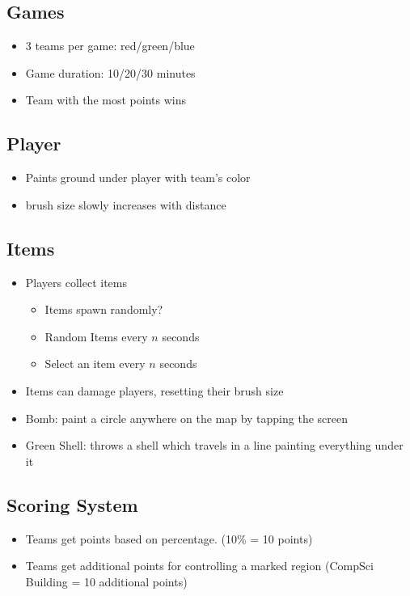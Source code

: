 \documentclass{article}
\begin{document}
\subsection{Games}
\begin{itemize}
\item 3 teams per game: red/green/blue
\item Game duration: 10/20/30 minutes
\item Team with the most points wins
\end{itemize}

\subsection{Player}
\begin{itemize}
\item Paints ground under player with team's color
\item brush size slowly increases with distance
\end{itemize}

\subsection{Items}
\begin{itemize}
\item Players collect items
	\begin{itemize}
	\item Items spawn randomly?
    \item Random Items every $n$ seconds
    \item Select an item every $n$ seconds
	\end{itemize}
\item Items can damage players, resetting their brush size
\item Bomb: paint a circle anywhere on the map by tapping the screen
\item Green Shell: throws a shell which travels in a line painting everything under it
\end{itemize}

\subsection{Scoring System}
\begin{itemize}
\item Teams get points based on percentage. (10\% = 10 points)
\item Teams get additional points for controlling a marked region (CompSci Building = 10 additional points)
\end{itemize}
\end{document}
